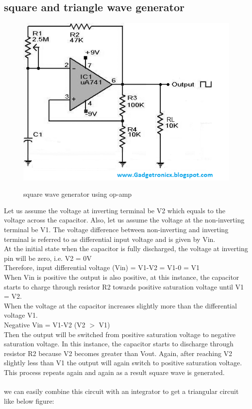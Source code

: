 \documentclass[11pt]{article}
\begin{document}
\subsection{square and triangle wave generator}
\begin{figure}[H]
    \begin{center}
        \includegraphics[scale=0.5]{Fig/square.png}
        \label{fig:square}
        \caption{square wave generator using op-amp}
    \end{center}
\end{figure}
Let us assume the voltage at inverting terminal be V2 which equals to the voltage across the capacitor. Also, let us assume the voltage at the non-inverting terminal be V1. The voltage difference between non-inverting and inverting terminal is referred to as differential input voltage and is given by Vin. \\
At the initial state when the capacitor is fully discharged, the voltage at inverting pin will be zero, i.e. V2 = 0V \\
Therefore, input differential voltage (Vin) = V1-V2 = V1-0 = V1 \\
When Vin is positive the output is also positive, at this instance, the capacitor starts to charge through resistor R2 towards positive saturation voltage until V1 = V2. \\
When the voltage at the capacitor increases slightly more than the differential voltage V1. \\
Negative Vin = V1-V2 (V2 $>$ V1) \\
Then the output will be switched from positive saturation voltage to negative saturation voltage. In this instance, the capacitor starts to discharge through resistor R2 because V2 becomes greater than Vout. Again, after reaching V2 slightly less than V1 the output will again switch to positive saturation voltage. This process repeats again and again as a result square wave is generated. \\ \\
we can easily combine this circuit with an integrator to get a triangular circuit like below figure:
\end{document}
